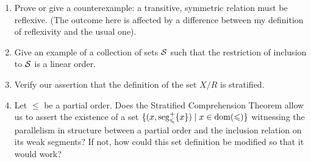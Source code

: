 \begin{enumerate}

\item  Prove or give a counterexample:  a transitive, symmetric relation must
  be reflexive.  (The outcome here is affected by a
  difference between my definition of reflexivity and the usual one).

\item Give an example of a collection of sets $\cal S$ such that the
  restriction of inclusion to $\cal S$ is a linear order.

\item  Verify our assertion that the definition of the set $X/R$ is
  stratified.

\item  Let $\leq$ be a partial order.  Does the Stratified Comprehension
  Theorem allow us to assert the
  existence of a set $\{(x,\mathop{\mathrm{seg}}^+_{\leqslant}\{x\})\mid x \in \mathop{\mathrm{dom}}(\leqslant)\}$
  witnessing the parallelism in structure between a partial order and the
  inclusion relation on its weak segments?  If not, how
  could this set definition be modified so that it would work?

\end{enumerate}
